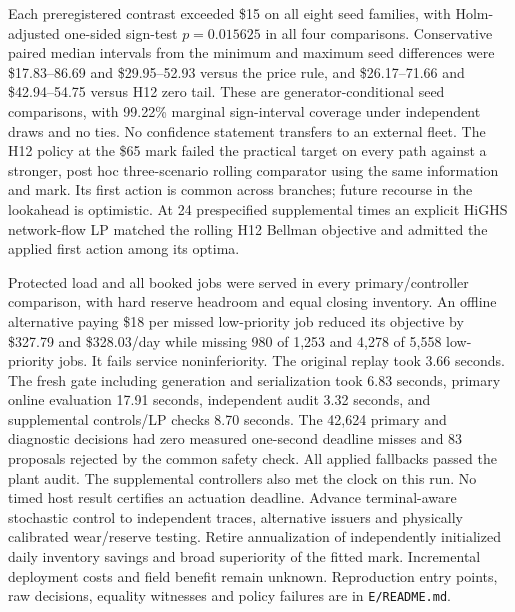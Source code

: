 \documentclass[10pt,letterpaper]{article}
\begin{document}
Each preregistered contrast exceeded \$15 on all eight seed families, with Holm-adjusted one-sided sign-test $p=0.015625$ in all four comparisons. Conservative paired median intervals from the minimum and maximum seed differences were \$17.83--86.69 and \$29.95--52.93 versus the price rule, and \$26.17--71.66 and \$42.94--54.75 versus H12 zero tail. These are generator-conditional seed comparisons, with 99.22\% marginal sign-interval coverage under independent draws and no ties. No confidence statement transfers to an external fleet. The H12 policy at the \$65 mark failed the practical target on every path against a stronger, post hoc three-scenario rolling comparator using the same information and mark. Its first action is common across branches; future recourse in the lookahead is optimistic. At 24 prespecified supplemental times an explicit HiGHS network-flow LP matched the rolling H12 Bellman objective and admitted the applied first action among its optima.

Protected load and all booked jobs were served in every primary/controller comparison, with hard reserve headroom and equal closing inventory. An offline alternative paying \$18 per missed low-priority job reduced its objective by \$327.79 and \$328.03/day while missing 980 of 1,253 and 4,278 of 5,558 low-priority jobs. It fails service noninferiority. The original replay took 3.66 seconds. The fresh gate including generation and serialization took 6.83 seconds, primary online evaluation 17.91 seconds, independent audit 3.32 seconds, and supplemental controls/LP checks 8.70 seconds. The 42,624 primary and diagnostic decisions had zero measured one-second deadline misses and 83 proposals rejected by the common safety check. All applied fallbacks passed the plant audit. The supplemental controllers also met the clock on this run. No timed host result certifies an actuation deadline. Advance terminal-aware stochastic control to independent traces, alternative issuers and physically calibrated wear/reserve testing. Retire annualization of independently initialized daily inventory savings and broad superiority of the fitted mark. Incremental deployment costs and field benefit remain unknown. Reproduction entry points, raw decisions, equality witnesses and policy failures are in \texttt{E/README.md}.
\end{document}
